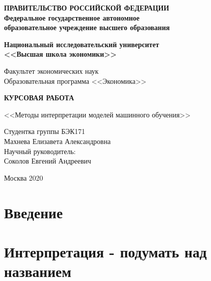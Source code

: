 \documentclass[a4paper, 12pt]{article}
\begin{document}
\thispagestyle{empty}
\begin{center}
	\textbf{ПРАВИТЕЛЬСТВО РОССИЙСКОЙ ФЕДЕРАЦИИ}\\
	\vspace{3ex}
	\textbf{Федеральное государственное автономное\\ образовательное учреждение высшего образования}
	
	\vspace{3ex}
	
	\textbf{Национальный исследовательский университет \\ <<Высшая школа экономики>>}
	
	\vspace{10ex}
	\begin{flushright}
		Факультет экономических наук\\
		Образовательная программа <<Экономика>>
	\end{flushright}
\end{center}
\vspace{12ex}

\begin{center}
	{\textbf{КУРСОВАЯ РАБОТА
	}}
	\vspace{1ex}
	
	<<Методы интерпретации моделей машинного обучения>>
\end{center}
\vspace{4ex}
\begin{flushright}
	\noindent
	Студентка группы БЭК171\\Махнева Елизавета Александровна\\
	\vspace{13ex}
	Научный руководитель:\\
	Соколов Евгений Андреевич
	
\end{flushright}	

\vfill

\begin{center}
	Москва 2020
	
\end{center}
\newpage
	\tableofcontents
	\newpage
	
	\section{Введение}
	
	\newpage
	
	\section{Интерпретация - подумать над названием}
\end{document}
